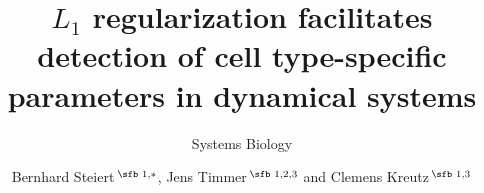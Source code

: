 \documentclass{bioinfo}
\newcommand{\boldm}[1] {\mathversion{bold}#1\mathversion{normal}}
\begin{document}

\subtitle{Systems Biology}

\title[$L_1$ regularization to detect differences between cell types]{{\boldm $L_1$} regularization facilitates detection of cell type-specific parameters in dynamical systems}
\author[Steiert \textit{et~al}.]{Bernhard Steiert\,$^{\text{\sfb 1,}*}$, Jens Timmer\,$^{\text{\sfb 1,2,3}}$ and Clemens Kreutz\,$^{\text{\sfb 1,3}}$}
\address{$^{\text{\sf 1}}$Institute of Physics, University of Freiburg, Germany, \\
$^{\text{\sf 2}}$BIOSS Centre for Biological Signalling Studies, University of Freiburg, Germany, and \\
$^{\text{\sf 3}}$Freiburg Center for Systems Biology (ZBSA), University of Freiburg, Germany.}


\end{document}
